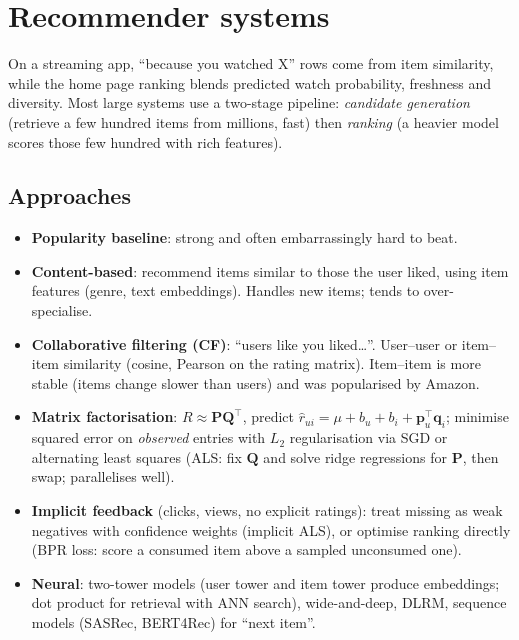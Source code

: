 \section{Recommender systems}

\begin{realworld}
On a streaming app, ``because you watched X'' rows come from item similarity, while the home page ranking blends predicted watch probability, freshness and diversity. Most large systems use a two-stage pipeline: \emph{candidate generation} (retrieve a few hundred items from millions, fast) then \emph{ranking} (a heavier model scores those few hundred with rich features).
\end{realworld}

\subsection{Approaches}
\begin{itemize}
  \item \textbf{Popularity baseline}: strong and often embarrassingly hard to beat.
  \item \textbf{Content-based}: recommend items similar to those the user liked, using item features (genre, text embeddings). Handles new items; tends to over-specialise.
  \item \textbf{Collaborative filtering (CF)}: ``users like you liked\dots''. User--user or item--item similarity (cosine, Pearson on the rating matrix). Item--item is more stable (items change slower than users) and was popularised by Amazon.
  \item \textbf{Matrix factorisation}: $R\approx\mathbf{P}\mathbf{Q}^\top$, predict $\hat r_{ui}=\mu+b_u+b_i+\mathbf{p}_u^\top\mathbf{q}_i$; minimise squared error on \emph{observed} entries with $L_2$ regularisation via SGD or alternating least squares (ALS: fix $\mathbf{Q}$ and solve ridge regressions for $\mathbf{P}$, then swap; parallelises well).
  \item \textbf{Implicit feedback} (clicks, views, no explicit ratings): treat missing as weak negatives with confidence weights (implicit ALS), or optimise ranking directly (BPR loss: score a consumed item above a sampled unconsumed one).
  \item \textbf{Neural}: two-tower models (user tower and item tower produce embeddings; dot product for retrieval with ANN search), wide-and-deep, DLRM, sequence models (SASRec, BERT4Rec) for ``next item''.
\end{itemize}

